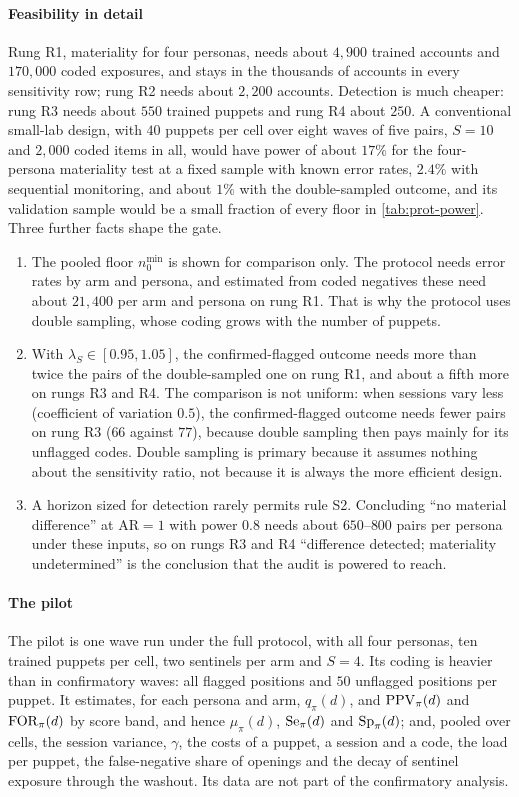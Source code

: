 \paragraph{Feasibility in detail}
Rung R1, materiality for four personas, needs about $4{,}900$ trained accounts and $170{,}000$ coded exposures, and stays in the thousands of accounts in every sensitivity row; rung R2 needs about $2{,}200$ accounts. Detection is much cheaper: rung R3 needs about $550$ trained puppets and rung R4 about $250$. A conventional small-lab design, with $40$ puppets per cell over eight waves of five pairs, $S=10$ and $2{,}000$ coded items in all, would have power of about $17\%$ for the four-persona materiality test at a fixed sample with known error rates, $2.4\%$ with sequential monitoring, and about $1\%$ with the double-sampled outcome, and its validation sample would be a small fraction of every floor in \cref{tab:prot-power}. Three further facts shape the gate.
\begin{enumerate}[(1)]
  \item The pooled floor $n_0^{\min}$ is shown for comparison only. The protocol needs error rates by arm and persona, and estimated from coded negatives these need about $21{,}400$ per arm and persona on rung R1. That is why the protocol uses double sampling, whose coding grows with the number of puppets.
  \item With $\lambda_S\in[0.95,1.05]$, the confirmed-flagged outcome needs more than twice the pairs of the double-sampled one on rung R1, and about a fifth more on rungs R3 and R4. The comparison is not uniform: when sessions vary less (coefficient of variation $0.5$), the confirmed-flagged outcome needs fewer pairs on rung R3 ($66$ against $77$), because double sampling then pays mainly for its unflagged codes. Double sampling is primary because it assumes nothing about the sensitivity ratio, not because it is always the more efficient design.
  \item A horizon sized for detection rarely permits rule S2. Concluding ``no material difference'' at $\mathrm{AR}=1$ with power $0.8$ needs about $650$--$800$ pairs per persona under these inputs, so on rungs R3 and R4 ``difference detected; materiality undetermined'' is the conclusion that the audit is powered to reach.
\end{enumerate}

\paragraph{The pilot}
The pilot is one wave run under the full protocol, with all four personas, ten trained puppets per cell, two sentinels per arm and $S=4$. Its coding is heavier than in confirmatory waves: all flagged positions and $50$ unflagged positions per puppet. It estimates, for each persona and arm, $q_\pi(d)$, and $\mathrm{PPV}_\pi(d)$ and $\mathrm{FOR}_\pi(d)$ by score band, and hence $\mu_\pi(d)$, $\mathrm{Se}_\pi(d)$ and $\mathrm{Sp}_\pi(d)$; and, pooled over cells, the session variance, $\gamma$, the costs of a puppet, a session and a code, the load per puppet, the false-negative share of openings and the decay of sentinel exposure through the washout. Its data are not part of the confirmatory analysis.


